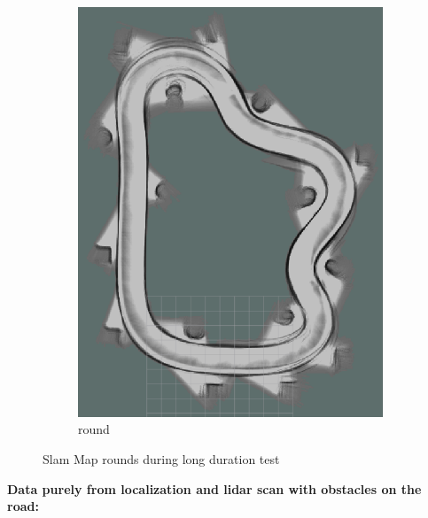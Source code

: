 \begin{figure}[H]
\begin{subfigure}{.3\linewidth}
		\includegraphics[width=\textwidth]{Pictures/2slamtest7}
		\caption{ round}
	\end{subfigure}

	\caption{Slam Map rounds during long duration test}
	\label{3slamtest}

\end{figure}


\textbf{Data purely from localization and lidar scan with obstacles on the road:}\\

